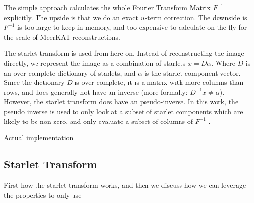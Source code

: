 The simple approach calculates the whole Fourier Transform Matrix $F^{-1}$ explicitly. The upside is that we do an exact $w$-term correction. The downside is $F^{-1}$ is too large to keep in memory, and too expensive to calculate on the fly for the scale of MeerKAT reconstructions. 

The starlet transform is used from here on. Instead of reconstructing the image directly, we represent the image as a combination of starlets $x = D\alpha$. Where $D$ is an over-complete dictionary of starlets, and $\alpha$ is the starlet component vector. Since the dictionary $D$ is over-complete, it is a matrix with more columns than rows, and does generally not have an inverse (more formally: $D^{-1}x \neq \alpha$). However, the starlet transform does have an pseudo-inverse. In this work, the pseudo inverse is used to only look at a subset of starlet components which are likely to be non-zero, and only evaluate a subset of columns of $F^{-1}$ .

Actual implementation







\subsection{Starlet Transform} \label{cd:starlets}
First how the starlet transform works, and then we discuss how we can leverage the properties to only use

